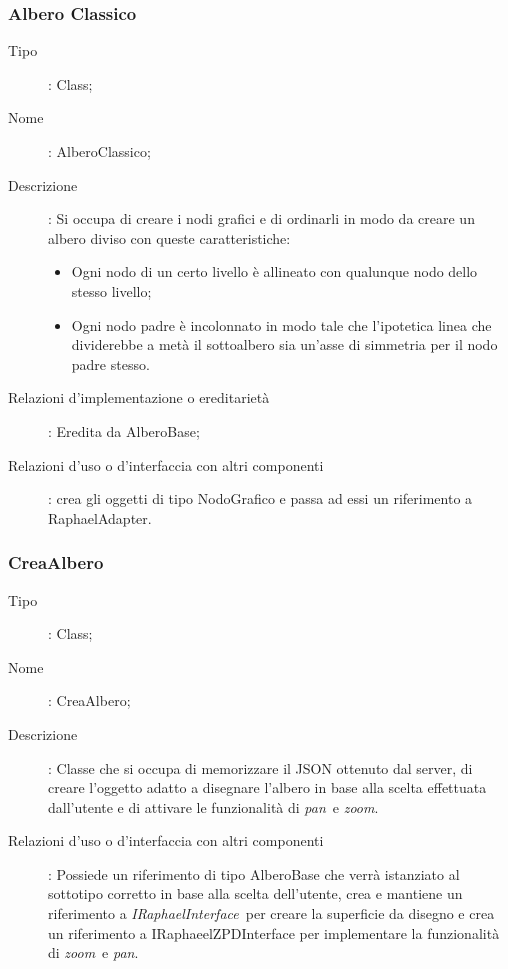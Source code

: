 \subsubsection{Albero Classico}
\begin{description}
\item[Tipo]: Class;
\item[Nome]: AlberoClassico;
\item[Descrizione]: Si occupa di creare i nodi grafici e di ordinarli in modo da creare un albero diviso con queste caratteristiche:
\begin{itemize}
\item Ogni nodo di un certo livello è allineato con qualunque nodo dello stesso livello;
\item Ogni nodo padre è incolonnato in modo tale che l'ipotetica linea che dividerebbe a metà il sottoalbero sia un'asse di simmetria per il nodo padre stesso.
\end{itemize}
\item[Relazioni d'implementazione o ereditarietà]: Eredita da AlberoBase;
\item[Relazioni d'uso o d'interfaccia con altri componenti]: crea gli oggetti di tipo NodoGrafico e passa ad essi un riferimento a RaphaelAdapter.
\end{description}
\subsubsection{CreaAlbero}
\begin{description}
\item[Tipo]: Class;
\item[Nome]: CreaAlbero;
\item[Descrizione]: Classe che si occupa di memorizzare il JSON ottenuto dal server, di creare l'oggetto adatto a disegnare l'albero in base alla scelta effettuata dall'utente e di attivare le funzionalità di \textit{pan}\ e \textit{zoom}.
\item[Relazioni d'uso o d'interfaccia con altri componenti]: Possiede un riferimento di tipo AlberoBase che verrà istanziato al sottotipo corretto in base alla scelta dell'utente, crea e mantiene un riferimento a \textit{IRaphaelInterface}\ per creare la superficie da disegno e crea un riferimento a IRaphaeelZPDInterface per implementare la funzionalità di \textit{zoom}\ e \textit{pan}.
\end{description}
